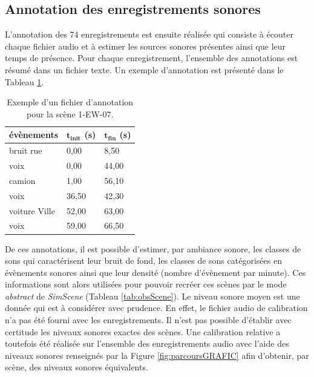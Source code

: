 \subsection{Annotation des enregistrements sonores}\label{part:scene_annotation}

L'annotation des 74 enregistrements est ensuite réalisée qui consiste à écouter chaque fichier audio et à estimer les sources sonores présentes ainsi que leur temps de présence. Pour chaque enregistrement, l'ensemble des annotations est résumé dans un fichier texte. Un exemple d'annotation est présenté dans le Tableau \ref{tab:exemple_annotation}.\\

\begin{table}[h]
\caption{Exemple d'un fichier d'annotation pour la scène 1-EW-07.}
\centering
\begin{tabular}{lll}
\textbf{évènements}    & $\mathbf{t_{init}}$ \textbf{(s)} & $\mathbf{t_{fin}}$ \textbf{(s)} \\ \toprule
bruit rue     & 0,00            & 8,50           \\
\rowcolor[HTML]{C0C0C0}
voix          & 0,00            & 44,00          \\
camion        & 1,00            & 56,10          \\
\rowcolor[HTML]{C0C0C0}
voix          & 36,50           & 42,30          \\
voiture Ville & 52,00          & 63,00          \\
\rowcolor[HTML]{C0C0C0}
voix          & 59,00           & 66,50         \\ \bottomrule
\end{tabular}
\label{tab:exemple_annotation}
\end{table}



De ces annotations, il est possible d'estimer, par ambiance sonore, les classes de sons qui caractérisent leur bruit de fond, les classes de sons catégorisées en évènements sonores ainsi que leur densité (nombre d'évènement par minute). Ces informations sont alors utilisées pour pouvoir recréer ces scènes par le mode \textit{abstract} de \textit{SimScene} (Tableau \ref{tab:obsScene}). Le niveau sonore moyen est une donnée qui est à considérer avec prudence. En effet, le fichier audio de calibration n'a pas été fourni avec les enregistrements. Il n'est pas possible d'établir avec certitude les niveaux sonores exactes des scènes. Une calibration relative a toutefois été réalisée sur l'ensemble des enregistrements audio avec l'aide des niveaux sonores renseignés par la Figure \ref{fig:parcoursGRAFIC} afin d'obtenir, par scène, des niveaux sonores équivalents.\\

